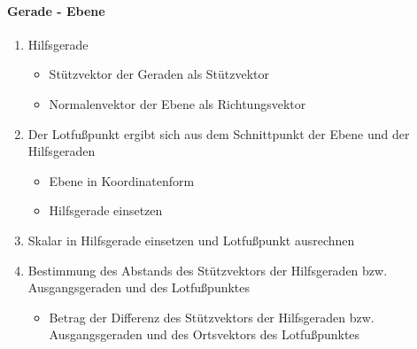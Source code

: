 \documentclass{article}
\begin{document}
  \paragraph{Gerade - Ebene}
  \begin{enumerate}
  	\item Hilfsgerade
  	\begin{itemize}
  		\item Stützvektor der Geraden als Stützvektor
  		\item Normalenvektor der Ebene als Richtungsvektor
  	\end{itemize}
  	\item Der Lotfußpunkt ergibt sich aus dem Schnittpunkt der Ebene und der Hilfsgeraden
  	\begin{itemize}
  		\item Ebene in Koordinatenform
  		\item Hilfsgerade einsetzen
  	\end{itemize}
  	\item Skalar in Hilfsgerade einsetzen und Lotfußpunkt ausrechnen
  	\item Bestimmung des Abstands des Stützvektors der Hilfsgeraden bzw. Ausgangsgeraden und des Lotfußpunktes
  	\begin{itemize}
  		\item Betrag der Differenz des Stützvektors der Hilfsgeraden bzw. Ausgangsgeraden und des Ortsvektors des Lotfußpunktes
	\end{itemize}  	 
  \end{enumerate}
  
\end{document}

